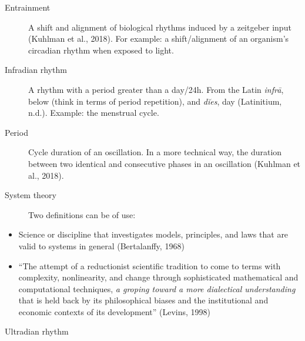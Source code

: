 \begin{termos}
\begin{description}
\item[Entrainment]
\hspace{20cm}

A shift and alignment of biological rhythms induced by a zeitgeber input
(Kuhlman et al., 2018). For example: a shift/alignment of an organism's
circadian rhythm when exposed to light.
\end{description}

\begin{description}
\item[Infradian rhythm]
\hspace{20cm}

A rhythm with a period greater than a day/24h. From the Latin
\emph{infrā}, below (think in terms of period repetition), and
\emph{dĭes}, day (Latinitium, n.d.). Example: the menstrual cycle.
\end{description}

\begin{description}
\item[Period]
\hspace{20cm}

Cycle duration of an oscillation. In a more technical way, the duration
between two identical and consecutive phases in an oscillation (Kuhlman
et al., 2018).
\end{description}

\begin{description}
\item[System theory]
\hspace{20cm}

Two definitions can be of use:
\end{description}

\begin{itemize}
\tightlist
\item
  Science or discipline that investigates models, principles, and laws
  that are valid to systems in general (Bertalanffy, 1968)
\item
  ``The attempt of a reductionist scientific tradition to come to terms
  with complexity, nonlinearity, and change through sophisticated
  mathematical and computational techniques, \emph{a groping toward a
  more dialectical understanding} that is held back by its philosophical
  biases and the institutional and economic contexts of its
  development'' (Levins, 1998)
\end{itemize}

\begin{description}
\item[Ultradian rhythm]
\hspace{20cm}


\end{description}
\end{termos}
